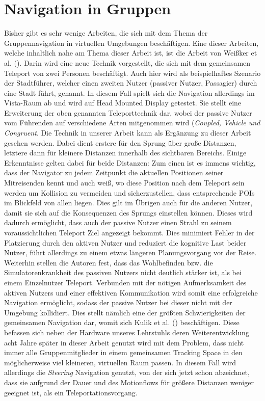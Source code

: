 \section{Navigation in Gruppen}
Bisher gibt es sehr wenige Arbeiten, die sich mit dem Thema der Gruppennavigation in virtuellen Umgebungen beschäftigen. Eine dieser Arbeiten, welche inhaltlich nahe am Thema dieser Arbeit ist, ist die Arbeit von Weißker et al. (\cite{WeisskerMulti-RayReality}). Darin wird eine neue Technik vorgestellt, die sich mit dem gemeinsamen Teleport von zwei Personen beschäftigt. Auch hier wird als beispielhaftes Szenario der Stadtführer, welcher einen zweiten Nutzer (passiver Nutzer, Passagier) durch eine Stadt führt, genannt. 
In diesem Fall spielt sich die Navigation allerdings im Vista-Raum ab und wird auf Head Mounted Display getestet. Sie stellt eine Erweiterung der oben genannten Teleporttechnik dar, wobei der passive Nutzer vom Führenden auf verschiedene Arten mitgenommen wird (\textit{Coupled, Vehicle und Congruent}. Die Technik in unserer Arbeit kann als Ergänzung zu dieser Arbeit gesehen werden. Dabei dient erstere für den Sprung über große Distanzen, letztere dann für kleinere Distanzen innerhalb des sichtbaren Bereichs. Einige Erkenntnisse gelten dabei für beide Distanzen: Zum einen ist es immens wichtig, dass der Navigator zu jedem Zeitpunkt die aktuellen Positionen seiner Mitreisenden kennt und auch weiß, wo diese Position nach dem Teleport sein werden um Kollision zu vermeiden und sicherzustellen, dass entsprechende POIs im Blickfeld von allen liegen. Dies gilt im Übrigen auch für die anderen Nutzer, damit sie sich auf die Konsequenzen des Sprungs einstellen können. Dieses wird dadurch ermöglicht, dass auch der passive Nutzer einen Strahl zu seinem voraussichtlichen Teleport Ziel angezeigt bekommt. Dies minimiert Fehler in der Platzierung durch den aktiven Nutzer und reduziert die kognitive Last beider Nutzer, führt allerdings zu einem etwas längeren Planungsvorgang vor der Reise. Weiterhin stellen die Autoren fest, dass das Wohlbefinden bzw. die Simulatorenkrankheit des passiven Nutzers nicht deutlich stärker ist, als bei einem Einzelnutzer Teleport. Verbunden mit der nötigen Aufmerksamkeit des aktiven Nutzers und einer effektiven Kommunikation wird somit eine erfolgreiche Navigation ermöglicht, sodass der passive Nutzer bei dieser nicht mit der Umgebung kollidiert. Dies stellt nämlich eine der größten Schwierigkeiten der gemeinsamen Navigation dar, womit sich Kulik et al. (\cite{Kulik2011C1x6}) beschäftigen. Diese befassen sich neben der Hardware unseres Lehrstuhls deren Weiterentwicklung acht Jahre später in dieser Arbeit genutzt wird mit dem Problem, dass nicht immer alle Gruppenmitglieder in einem gemeinsamen Tracking Space in den möglicherweise viel kleineren, virtuellen Raum passen. In diesem Fall wird allerdings die \textit{Steering} Navigation genutzt, von der sich jetzt schon abzeichnet, dass sie aufgrund der Dauer und des Motionflows für größere Distanzen weniger geeignet ist, als ein Teleportationsvorgang.

